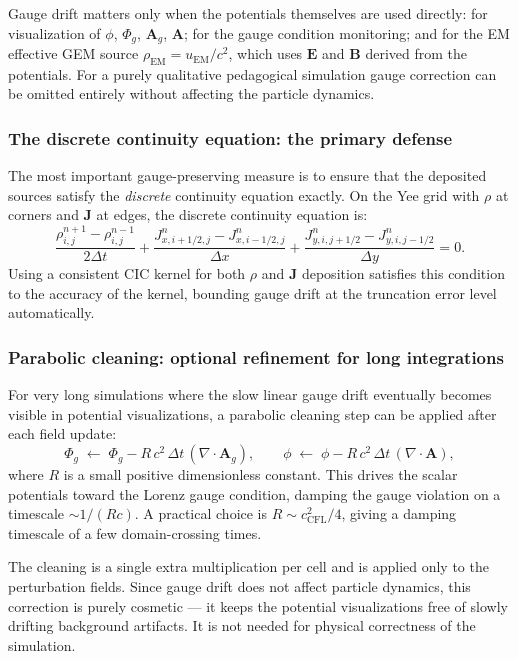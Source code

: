 \documentclass[11pt,a4paper]{article}
\newcommand{\vv}[1]{\mathbf{#1}}
\newcommand{\Phig}{\Phi_g}
\newcommand{\Ag}{\vv{A}_g}
\begin{document}
Gauge drift matters only when the potentials themselves are used directly: for visualization of $\phi$, $\Phig$, $\Ag$, $\vv{A}$; for the gauge condition monitoring; and for the EM effective GEM source $\rho_{\mathrm{EM}} = u_{\mathrm{EM}}/c^2$, which uses $\vv{E}$ and $\vv{B}$ derived from the potentials.  For a purely qualitative pedagogical simulation gauge correction can be omitted entirely without affecting the particle dynamics.

\subsubsection*{The discrete continuity equation: the primary defense}

The most important gauge-preserving measure is to ensure that the deposited sources satisfy the \emph{discrete} continuity equation exactly.  On the Yee grid with $\rho$ at corners and $\vv{J}$ at edges, the discrete continuity equation is:
\begin{equation}
  \frac{\rho^{n+1}_{i,j} - \rho^{n-1}_{i,j}}{2\Delta t}
  + \frac{J_{x,i+1/2,j}^n - J_{x,i-1/2,j}^n}{\Delta x}
  + \frac{J_{y,i,j+1/2}^n - J_{y,i,j-1/2}^n}{\Delta y} = 0.
\end{equation}
Using a consistent CIC kernel for both $\rho$ and $\vv{J}$ deposition satisfies this condition to the accuracy of the kernel, bounding gauge drift at the truncation error level automatically.

\subsubsection*{Parabolic cleaning: optional refinement for long integrations}

For very long simulations where the slow linear gauge drift eventually becomes visible in potential visualizations, a parabolic cleaning step can be applied after each field update:
\begin{equation}
\label{eq:parabolic_clean}
  \Phig \;\leftarrow\; \Phig - R\,c^2\,\Delta t\,(\nabla\cdot\Ag), \qquad
  \phi  \;\leftarrow\; \phi  - R\,c^2\,\Delta t\,(\nabla\cdot\vv{A}),
\end{equation}
where $R$ is a small positive dimensionless constant.  This drives the scalar potentials toward the Lorenz gauge condition, damping the gauge violation on a timescale $\sim 1/(Rc)$.  A practical choice is $R \sim c_{\mathrm{CFL}}^2/4$, giving a damping timescale of a few domain-crossing times.

The cleaning is a single extra multiplication per cell and is applied only to the perturbation fields.  Since gauge drift does not affect particle dynamics, this correction is purely cosmetic --- it keeps the potential visualizations free of slowly drifting background artifacts.  It is not needed for physical correctness of the simulation.
\end{document}
